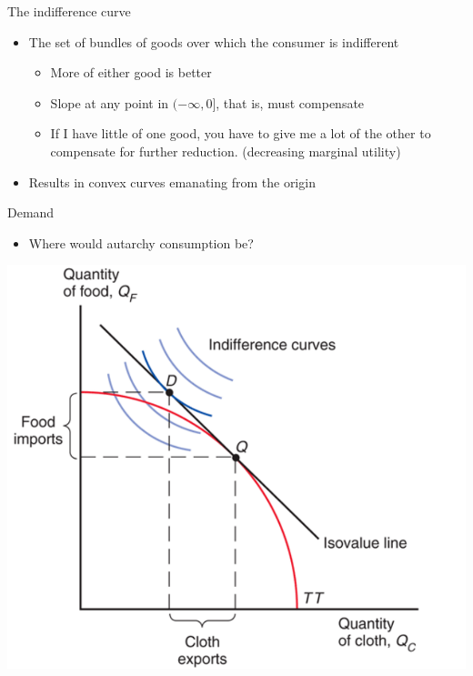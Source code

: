 \documentclass[ignorenonframetext,]{beamer}
\begin{document}
\begin{frame}{The indifference curve}

    \begin{itemize}
        \item The set of bundles of goods over which the consumer is indifferent 
        \begin{itemize}
        \item More of either good is better
        \item Slope at any point in $(-\infty,0]$, that is, must compensate
        \item If I have little of one good, you have to give me a lot of the other to compensate for further reduction. (decreasing marginal utility)
        \end{itemize}
        \item Results in convex curves emanating from the origin
    \end{itemize}

\end{frame}

\begin{frame}{Demand}
    \begin{itemize}
        \item Where would autarchy consumption be?
    \end{itemize}
    \includegraphics[scale=0.25]{ind_curves.png}

\end{frame}
\end{document}

